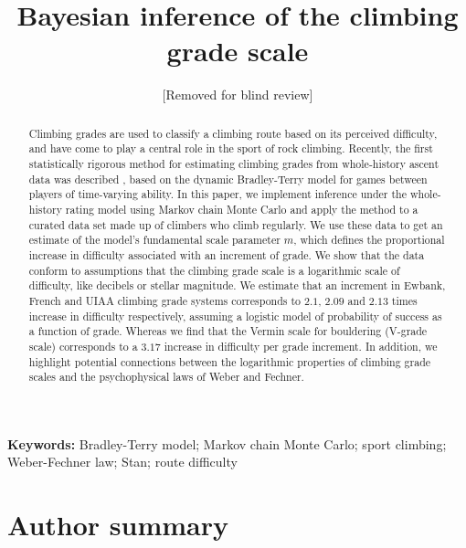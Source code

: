 \documentclass[12pt]{article}
\newcommand{\ewbankslope}{2.1}
\newcommand{\frenchslope}{2.09}
\newcommand{\uiaaslope}{2.13}
\newcommand{\verminslope}{3.17}
\begin{document}
\title{Bayesian inference of the climbing grade scale}

\author{[Removed for blind review]}

\date{}

\maketitle

\begin{abstract}
Climbing grades are used to classify a climbing route based on its perceived difficulty, and have come to play a central role in the sport of rock climbing. Recently, the first statistically rigorous method for estimating climbing grades from whole-history ascent data was described \citep{scarff2020estimation}, based on the dynamic Bradley-Terry model for games between players of time-varying ability. In this paper, we implement inference under the whole-history rating model using Markov chain Monte Carlo and apply the method to a curated data set made up of climbers who climb regularly. We use these data to get an estimate of the model's fundamental scale parameter $m$, which defines the proportional increase in difficulty associated with an increment of grade. We show that the data conform to assumptions that the climbing grade scale is a logarithmic scale of difficulty, like decibels or stellar magnitude. We estimate that an increment in Ewbank, French and UIAA climbing grade systems corresponds to $\ewbankslope{}$, $\frenchslope{}$ and $\uiaaslope$ times increase in difficulty respectively, assuming a logistic model of probability of success as a function of grade. Whereas we find that the Vermin scale for bouldering (V-grade scale) corresponds to a $\verminslope$ increase in difficulty per grade increment. In addition, we highlight potential connections between the logarithmic properties of climbing grade scales and the psychophysical laws of Weber and Fechner.
\end{abstract}

\noindent\textbf{Keywords:} Bradley-Terry model; Markov chain Monte Carlo; sport climbing; Weber-Fechner law; Stan; route difficulty

\section{Author summary}
\end{document}
